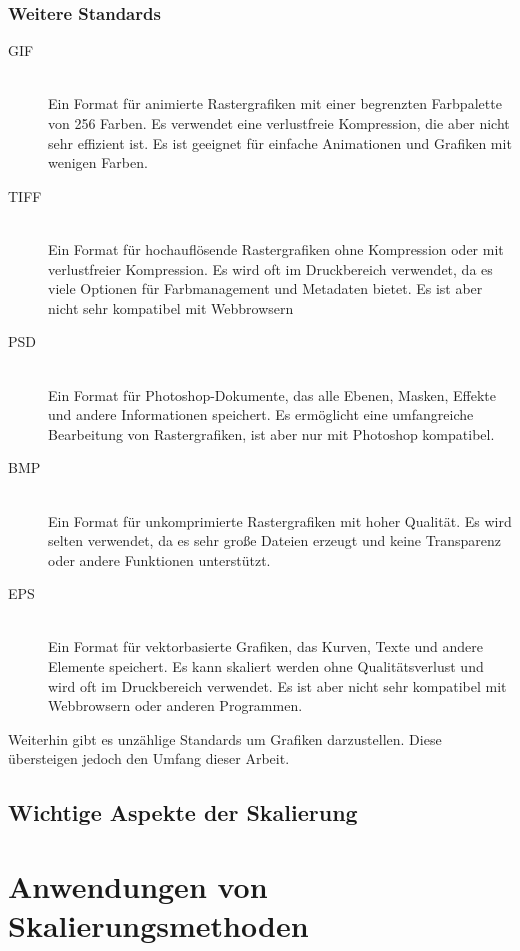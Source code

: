 \subsubsection{Weitere Standards}
\begin{description}
\item[GIF] \\
Ein Format für animierte Rastergrafiken mit einer begrenzten Farbpalette von 256 Farben. Es verwendet eine verlustfreie Kompression, die aber nicht sehr effizient ist. Es ist geeignet für einfache Animationen und Grafiken mit wenigen Farben. \\
\item[TIFF] \\ 
Ein Format für hochauflösende Rastergrafiken ohne Kompression oder mit verlustfreier Kompression. Es wird oft im Druckbereich verwendet, da es viele Optionen für Farbmanagement und Metadaten bietet. Es ist aber nicht sehr kompatibel mit Webbrowsern \\
\item[PSD] \\
Ein Format für Photoshop-Dokumente, das alle Ebenen, Masken, Effekte und andere Informationen speichert. Es ermöglicht eine umfangreiche Bearbeitung von Rastergrafiken, ist aber nur mit Photoshop kompatibel.\\
\item[BMP] \\
Ein Format für unkomprimierte Rastergrafiken mit hoher Qualität. Es wird selten verwendet, da es sehr große Dateien erzeugt und keine Transparenz oder andere Funktionen unterstützt. \\
\item[EPS] \\
Ein Format für vektorbasierte Grafiken, das Kurven, Texte und andere Elemente speichert. Es kann skaliert werden ohne Qualitätsverlust und wird oft im Druckbereich verwendet. Es ist aber nicht sehr kompatibel mit Webbrowsern oder anderen Programmen. \\
\end{description}
Weiterhin gibt es unzählige Standards um Grafiken darzustellen. Diese übersteigen jedoch den Umfang dieser Arbeit.
\subsection{Wichtige Aspekte der Skalierung}

\section{Anwendungen von Skalierungsmethoden}
